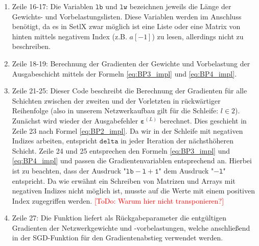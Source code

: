 \begin{enumerate}
\item Zeile 16-17: Die Variablen $\mathtt{lb}$ und $\mathtt{lw}$ bezeichnen jeweils die Länge der Gewichts- und Vorbelastungslisten. Diese Variablen werden im Anschluss benötigt, da es in SetlX zwar möglich ist eine Liste oder eine Matrix von hinten mittels negativem Index (z.B. $a[-1]$) zu lesen, allerdings nicht zu beschreiben.
\item Zeile 18-19: Berechnung der Gradienten der Gewichte und Vorbelastung der Ausgabeschicht mittels der Formeln \eqref{eq:BP3_impl} und \eqref{eq:BP4_impl}.
\item Zeile 21-25: Dieser Code beschreibt die Berechnung der Gradienten für alle Schichten zwischen der zweiten und der Vorletzten in rückwärtiger Reihenfolge (also in unserem Netzwerkaufbau gilt für die Schleife: $l \in {2}$). Zunächst wird wieder der Ausgabefehler $\boldsymbol{\varepsilon}^{(L)}$ berechnet. Dies geschieht in Zeile 23 nach Formel \eqref{eq:BP2_impl}. Da wir in der Schleife mit negativen Indizes arbeiten, entspricht $\mathtt{delta}$ in jeder Iteration der nächsthöheren Schicht. Zeile 24 und 25 entsprechen den Formeln \eqref{eq:BP3_impl} und \eqref{eq:BP4_impl} und passen die Gradientenvariablen entsprechend an. Hierbei ist zu beachten, dass der Ausdruck "$\mathtt{lb-l+1}$" dem Ausdruck "$\mathtt{-l}$" entspricht. Da wie erwähnt ein Schreiben von Matrizen und Arrays mit negativen Indizes nicht möglich ist, musste auf die Werte mit einem positiven Index zugegriffen werden. \textcolor{red}{[ToDo: Warum hier nicht transponieren?]}
\item Zeile 27: Die Funktion liefert als Rückgabeparameter die entgültigen Gradienten der Netzwerkgewichte und -vorbelastungen, welche anschließend in der SGD-Funktion für den Gradientenabstieg verwendet werden.
\end{enumerate}


